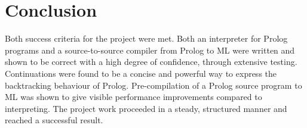 \documentclass[12pt]{article}
\begin{document}

\newpage

\section{Conclusion}

Both success criteria for the project were met. Both an interpreter for Prolog programs and a source-to-source compiler from Prolog to ML were written and shown to be correct with a high degree of confidence, through extensive testing. Continuations were found to be a concise and powerful way to express the backtracking behaviour of Prolog. Pre-compilation of a Prolog source program to ML was shown to give visible performance improvements compared to interpreting. The project work proceeded in a steady, structured manner and reached a successful result. 
\end{document}
